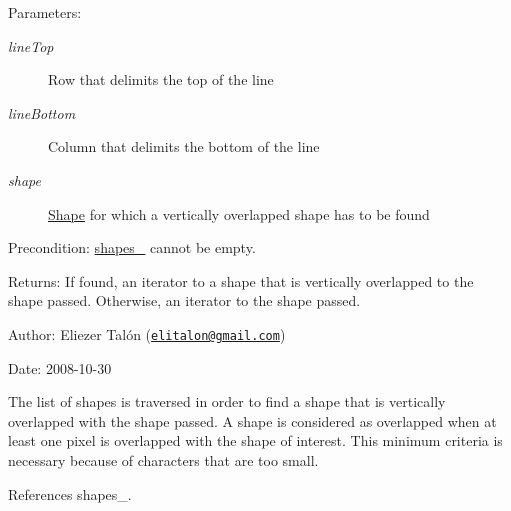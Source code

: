 \begin{Desc}
\item[Parameters:]
\begin{description}
\item[{\em lineTop}]Row that delimits the top of the line \item[{\em lineBottom}]Column that delimits the bottom of the line \item[{\em shape}]\hyperlink{class_shape}{Shape} for which a vertically overlapped shape has to be found\end{description}
\end{Desc}
\begin{Desc}
\item[Precondition:]\hyperlink{class_segmenter_41b94ede2829063e0937dc150756e77e}{shapes\_\-} cannot be empty.\end{Desc}
\begin{Desc}
\item[Returns:]If found, an iterator to a shape that is vertically overlapped to the shape passed. Otherwise, an iterator to the shape passed.\end{Desc}
\begin{Desc}
\item[Author:]Eliezer Talón (\href{mailto:elitalon@gmail.com}{\tt elitalon@gmail.com}) \end{Desc}
\begin{Desc}
\item[Date:]2008-10-30\end{Desc}
The list of shapes is traversed in order to find a shape that is vertically overlapped with the shape passed. A shape is considered as overlapped when at least one pixel is overlapped with the shape of interest. This minimum criteria is necessary because of characters that are too small. 

References shapes\_\-.